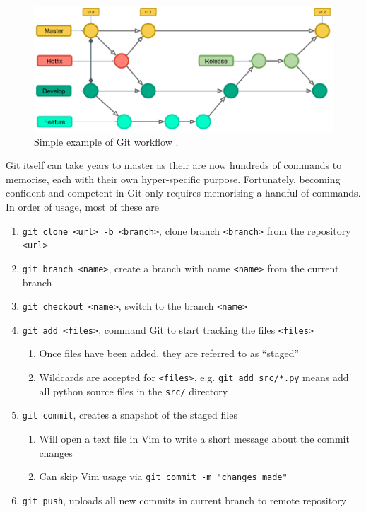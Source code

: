 \documentclass[11pt]{article}
\begin{document}
\begin{figure}[t!]
    \centering
    \includegraphics[width=1.0\textwidth]{figures/git_tree.png}
    \caption{Simple example of Git workflow \cite{git-flow}.}
    \label{fig:git-basic-usage}
\end{figure}

Git itself can take years to master as their are now hundreds of commands to memorise, each with their own hyper-specific purpose. Fortunately, becoming confident and competent in Git only requires memorising a handful of commands. In order of usage, most of these are

\begin{enumerate}
    \item \texttt{git clone <url> -b <branch>}, clone branch \texttt{<branch>} from the repository \texttt{<url>}
    \item \texttt{git branch <name>}, create a branch with name \texttt{<name>} from the current branch
    \item \texttt{git checkout <name>}, switch to the branch \texttt{<name>}
    \item \texttt{git add <files>}, command Git to start tracking the files \texttt{<files>}
    \begin{enumerate}
        \item Once files have been added, they are referred to as ``staged''
        \item Wildcards are accepted for \texttt{<files>}, e.g. \texttt{git add src/*.py} means add all \Gls{python} source files in the \texttt{src/} directory
    \end{enumerate}
    \item \texttt{git commit}, creates a snapshot of the staged files
    \begin{enumerate}
        \item Will open a text file in Vim to write a short message about the commit changes
        \item Can skip Vim usage via \texttt{git commit -m "changes made"}
    \end{enumerate}
    \item \texttt{git push}, uploads all new commits in current branch to remote repository
\end{enumerate}
\end{document}
